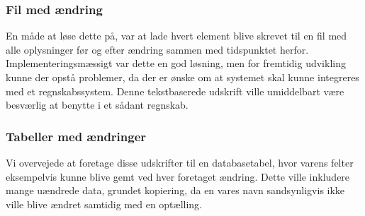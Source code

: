 \documentclass[]{article}
\begin{document}
\subsubsection{Fil med ændring}
\noindent En måde at løse dette på, var at lade hvert element blive skrevet til en fil med alle oplysninger før og efter ændring sammen med tidspunktet herfor. Implementeringsmæssigt var dette en god løsning, men for fremtidig udvikling kunne der opstå problemer, da der er ønske om at systemet skal kunne integreres med et regnskabssystem. Denne tekstbaserede udskrift ville umiddelbart være besværlig at benytte i et sådant regnskab.

\subsubsection{Tabeller med ændringer}
\noindent Vi overvejede at foretage disse udskrifter til en databasetabel, hvor varens felter eksempelvis kunne blive gemt ved hver foretaget ændring. Dette ville inkludere mange uændrede data, grundet kopiering, da en vares navn sandsynligvis ikke ville blive ændret samtidig med en optælling. 
\end{document}
